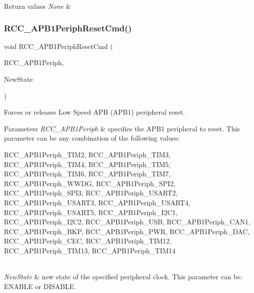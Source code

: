 \begin{DoxyRetVals}{Return values}
{\em None} & \\
\hline
\end{DoxyRetVals}
\mbox{\label{group___r_c_c___private___functions_gab197ae4369c10b92640a733b40ed2801}} 
\subsubsection{\texorpdfstring{RCC\_APB1PeriphResetCmd()}{RCC\_APB1PeriphResetCmd()}}
{\footnotesize\ttfamily void R\+C\+C\+\_\+\+A\+P\+B1\+Periph\+Reset\+Cmd (\begin{DoxyParamCaption}\item[{uint32\+\_\+t}]{R\+C\+C\+\_\+\+A\+P\+B1\+Periph,  }\item[{\mbox{\hyperlink{group___exported__types_gac9a7e9a35d2513ec15c3b537aaa4fba1}{Functional\+State}}}]{New\+State }\end{DoxyParamCaption})}



Forces or releases Low Speed A\+PB (A\+P\+B1) peripheral reset. 


\begin{DoxyParams}{Parameters}
{\em R\+C\+C\+\_\+\+A\+P\+B1\+Periph} & specifies the A\+P\+B1 peripheral to reset. This parameter can be any combination of the following values\+: \begin{DoxyItemize}
\item R\+C\+C\+\_\+\+A\+P\+B1\+Periph\+\_\+\+T\+I\+M2, R\+C\+C\+\_\+\+A\+P\+B1\+Periph\+\_\+\+T\+I\+M3, R\+C\+C\+\_\+\+A\+P\+B1\+Periph\+\_\+\+T\+I\+M4, R\+C\+C\+\_\+\+A\+P\+B1\+Periph\+\_\+\+T\+I\+M5, R\+C\+C\+\_\+\+A\+P\+B1\+Periph\+\_\+\+T\+I\+M6, R\+C\+C\+\_\+\+A\+P\+B1\+Periph\+\_\+\+T\+I\+M7, R\+C\+C\+\_\+\+A\+P\+B1\+Periph\+\_\+\+W\+W\+DG, R\+C\+C\+\_\+\+A\+P\+B1\+Periph\+\_\+\+S\+P\+I2, R\+C\+C\+\_\+\+A\+P\+B1\+Periph\+\_\+\+S\+P\+I3, R\+C\+C\+\_\+\+A\+P\+B1\+Periph\+\_\+\+U\+S\+A\+R\+T2, R\+C\+C\+\_\+\+A\+P\+B1\+Periph\+\_\+\+U\+S\+A\+R\+T3, R\+C\+C\+\_\+\+A\+P\+B1\+Periph\+\_\+\+U\+S\+A\+R\+T4, R\+C\+C\+\_\+\+A\+P\+B1\+Periph\+\_\+\+U\+S\+A\+R\+T5, R\+C\+C\+\_\+\+A\+P\+B1\+Periph\+\_\+\+I2\+C1, R\+C\+C\+\_\+\+A\+P\+B1\+Periph\+\_\+\+I2\+C2, R\+C\+C\+\_\+\+A\+P\+B1\+Periph\+\_\+\+U\+SB, R\+C\+C\+\_\+\+A\+P\+B1\+Periph\+\_\+\+C\+A\+N1, R\+C\+C\+\_\+\+A\+P\+B1\+Periph\+\_\+\+B\+KP, R\+C\+C\+\_\+\+A\+P\+B1\+Periph\+\_\+\+P\+WR, R\+C\+C\+\_\+\+A\+P\+B1\+Periph\+\_\+\+D\+AC, R\+C\+C\+\_\+\+A\+P\+B1\+Periph\+\_\+\+C\+EC, R\+C\+C\+\_\+\+A\+P\+B1\+Periph\+\_\+\+T\+I\+M12, R\+C\+C\+\_\+\+A\+P\+B1\+Periph\+\_\+\+T\+I\+M13, R\+C\+C\+\_\+\+A\+P\+B1\+Periph\+\_\+\+T\+I\+M14\end{DoxyItemize}
\\
\hline
{\em New\+State} & new state of the specified peripheral clock. This parameter can be\+: E\+N\+A\+B\+LE or D\+I\+S\+A\+B\+LE. \\
\hline
\end{DoxyParams}

